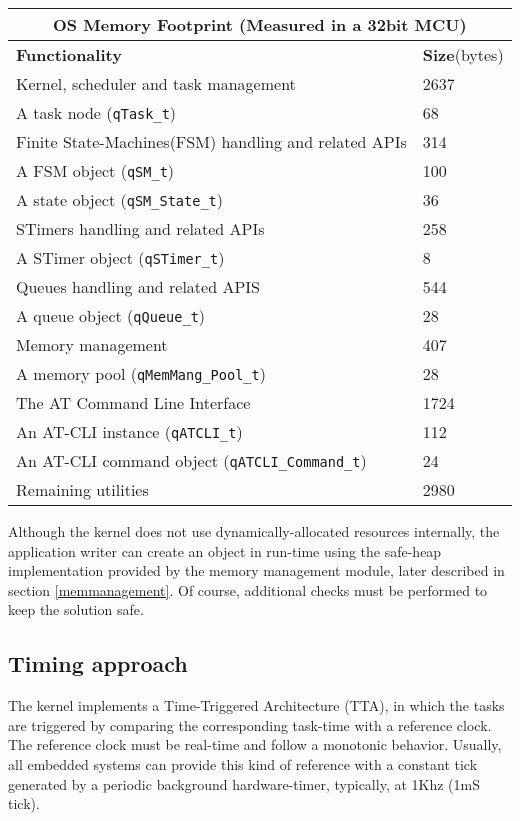 \begin{center}
\begin{tabular}{ |p{10cm}||p{1.5cm}|  }
    \hline
    \multicolumn{2}{|c|}{ \textbf{OS Memory Footprint} \scriptsize{(Measured in a 32bit MCU)}} \\
    \hline
    \textbf{Functionality} & \textbf{Size}\scriptsize{(bytes)}\\
    \hline
    Kernel, scheduler and task management& 2637\\
    A task node ({\lstinline!qTask_t!}) & 68\\
    Finite State-Machines(FSM) handling and related APIs& 314\\
    A FSM object ({\lstinline!qSM_t!}) & 100 \\
    A state object ({\lstinline!qSM_State_t!}) & 36 \\    
    STimers handling and related APIs & 258\\
    A STimer object ({\lstinline!qSTimer_t!})& 8\\
    Queues handling and related APIS & 544\\
    A queue object ({\lstinline!qQueue_t!}) & 28\\
    Memory management & 407\\
    A memory pool ({\lstinline!qMemMang_Pool_t!}) & 28 \\ 
    The AT Command Line Interface & 1724\\
    An AT-CLI instance ({\lstinline!qATCLI_t!})& 112\\
    An AT-CLI command object ({\lstinline!qATCLI_Command_t!})& 24\\
    Remaining utilities& 2980\\
    \hline
\end{tabular}
\end{center}

 \begin{tcolorbox}
 \HandRight Although the kernel does not use dynamically-allocated resources internally, the application writer can create an object in run-time using the safe-heap implementation provided by the memory management module, later described in section \ref{memmanagement}. Of course, additional checks must be performed to keep the solution safe.
 \end{tcolorbox}

\subsection{Timing approach}
The kernel implements a Time-Triggered Architecture (TTA)\cite{pont}, in which the tasks are triggered by comparing the corresponding task-time with a reference clock. The reference clock must be real-time and follow a monotonic behavior. Usually, all embedded systems can provide this kind of reference with a constant tick generated by a periodic background hardware-timer, typically, at 1Khz (1mS tick). 

